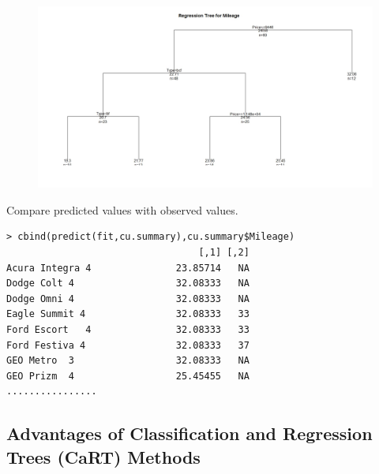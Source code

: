 \documentclass[caret-main.tex]{subfiles}
\begin{document}
\begin{figure}[h!]
\centering
\includegraphics[width=0.99\linewidth]{./regresstree1}
\caption{}
\label{fig:regresstree1}
\end{figure}
\newpage
Compare predicted values with observed values.
\begin{verbatim}
> cbind(predict(fit,cu.summary),cu.summary$Mileage)
                                  [,1] [,2]
Acura Integra 4               23.85714   NA
Dodge Colt 4                  32.08333   NA
Dodge Omni 4                  32.08333   NA
Eagle Summit 4                32.08333   33
Ford Escort   4               32.08333   33
Ford Festiva 4                32.08333   37
GEO Metro  3                  32.08333   NA
GEO Prizm  4                  25.45455   NA
................
\end{verbatim}
\newpage
\subsection{Advantages of Classification and Regression Trees (CaRT) Methods}
\end{document}
